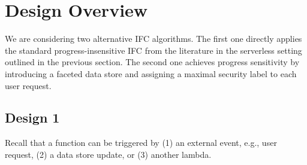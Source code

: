 \section{Design Overview}

We are considering two alternative IFC algorithms.  The first one 
directly applies the standard progress-insensitive IFC from the 
literature in the serverless setting outlined in the previous section.  
The second one achieves progress sensitivity by introducing a faceted 
data store and assigning a maximal security label to each user 
request.

\subsection{Design 1}

Recall that a function can be triggered by (1) an external event, 
e.g., user request, (2) a data store update, or (3) another lambda.

